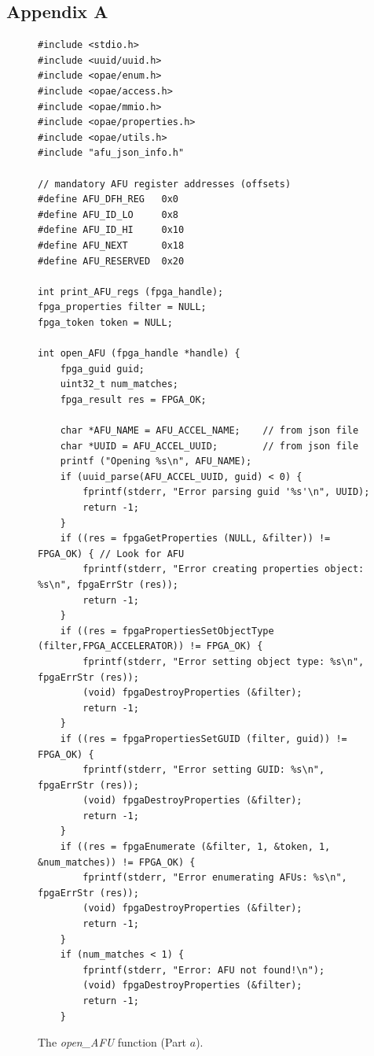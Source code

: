 \documentclass[epsfig,10pt,fullpage]{article}
\begin{document}
\newpage
\begin{center}\section*{Appendix A}\end{center}
\vspace{-1cm}
\lstset{language=C,numbers=none,escapechar=|}
\begin{figure}[H]
\begin{center}
\begin{minipage}[h]{\textwidth}
\begin{lstlisting}[name=manage]
#include <stdio.h>
#include <uuid/uuid.h>
#include <opae/enum.h>
#include <opae/access.h>
#include <opae/mmio.h>
#include <opae/properties.h>
#include <opae/utils.h>
#include "afu_json_info.h"

// mandatory AFU register addresses (offsets)
#define AFU_DFH_REG   0x0
#define AFU_ID_LO     0x8 
#define AFU_ID_HI     0x10
#define AFU_NEXT      0x18
#define AFU_RESERVED  0x20

int print_AFU_regs (fpga_handle);
fpga_properties filter = NULL;
fpga_token token = NULL;

int open_AFU (fpga_handle *handle) {
    fpga_guid guid;
    uint32_t num_matches;
    fpga_result res = FPGA_OK;

    char *AFU_NAME = AFU_ACCEL_NAME;    // from json file
    char *UUID = AFU_ACCEL_UUID;        // from json file
    printf ("Opening %s\n", AFU_NAME);
    if (uuid_parse(AFU_ACCEL_UUID, guid) < 0) {
        fprintf(stderr, "Error parsing guid '%s'\n", UUID);
        return -1;
    }
    if ((res = fpgaGetProperties (NULL, &filter)) != FPGA_OK) { // Look for AFU 
        fprintf(stderr, "Error creating properties object: %s\n", fpgaErrStr (res));
        return -1;
    }
    if ((res = fpgaPropertiesSetObjectType (filter,FPGA_ACCELERATOR)) != FPGA_OK) {
        fprintf(stderr, "Error setting object type: %s\n", fpgaErrStr (res));
        (void) fpgaDestroyProperties (&filter);
        return -1;
    }
    if ((res = fpgaPropertiesSetGUID (filter, guid)) != FPGA_OK) {
        fprintf(stderr, "Error setting GUID: %s\n", fpgaErrStr (res));
        (void) fpgaDestroyProperties (&filter);
        return -1;
    }
    if ((res = fpgaEnumerate (&filter, 1, &token, 1, &num_matches)) != FPGA_OK) {
        fprintf(stderr, "Error enumerating AFUs: %s\n", fpgaErrStr (res));
        (void) fpgaDestroyProperties (&filter);
        return -1;
    }
    if (num_matches < 1) {
        fprintf(stderr, "Error: AFU not found!\n");
        (void) fpgaDestroyProperties (&filter);
        return -1;
    }
\end{lstlisting}
\end{minipage}
\caption{The {\it open\_AFU} function (Part $a$).}
\label{fig:open_AFU}
\end{center}
\end{figure}
\end{document}
